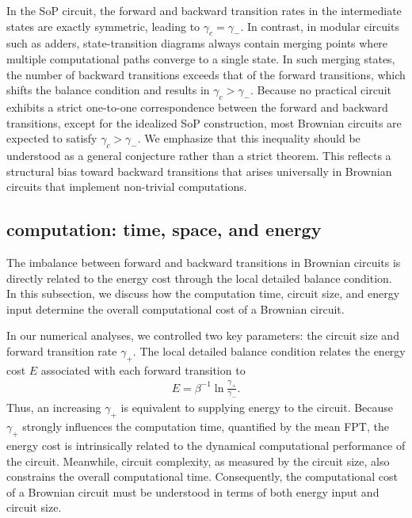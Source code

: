 \documentclass[%
 reprint,
superscriptaddress,
 amsmath,amssymb,
 aps,
 prx,
]{revtex4-2}
\begin{document}
In the SoP circuit, the forward and backward transition rates in the intermediate states are exactly symmetric, leading to $\gamma_c = \gamma_-$.
In contrast, in modular circuits such as adders, state-transition diagrams always contain merging points where multiple computational paths converge to a single state. In such merging states, the number of backward transitions exceeds that of the forward transitions, which shifts the balance condition and results in $\gamma_c > \gamma_-$. Because no practical circuit exhibits a strict one-to-one correspondence between the forward and backward transitions, except for the idealized SoP construction, most Brownian circuits are expected to satisfy $\gamma_c > \gamma_-$. We emphasize that this inequality should be understood as a general conjecture rather than a strict theorem. This reflects a structural bias toward backward transitions that arises universally in Brownian circuits that implement non-trivial computations. 

\subsection{computation: time, space, and energy}
The imbalance between forward and backward transitions in Brownian circuits is directly related to the energy cost through the local detailed balance condition. In this subsection, we discuss how the computation time, circuit size, and energy input determine the overall computational cost of a Brownian circuit. 

In our numerical analyses, we controlled two key parameters: the circuit size and forward transition rate $\gamma_+$. 
The local detailed balance condition relates the energy cost $E$ associated with each forward transition to 
\begin{gather}
    E = \beta^{-1} \ln \frac{\gamma_+}{\gamma_-}. 
    \label{eqn:local_detailed_balance}
\end{gather}
Thus, an increasing $\gamma_+$ is equivalent to supplying energy to the circuit. Because $\gamma_+$ strongly influences the computation time, quantified by the mean FPT, the energy cost is intrinsically related to the dynamical computational performance of the circuit. Meanwhile, circuit complexity, as measured by the circuit size, also constrains the overall computational time. Consequently, the computational cost of a Brownian circuit must be understood in terms of both energy input and circuit size.  
\end{document}
